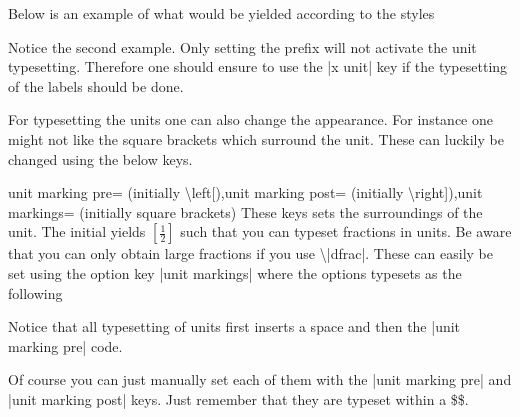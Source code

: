 Below is an example of what would be yielded according to the styles
\begin{codeexample}[code only]
\pgfplotsset{use units,x unit=T,xlabel=Temperature,ylabel=Nothing} 
\pgfplotsset{use units,x unit prefix=m,xlabel=Temperature,ylabel=Nothing} 
\end{codeexample}
Notice the second example. Only setting the prefix will not activate the unit typesetting. Therefore one should ensure to use the |x unit| key if the
typesetting of the labels should be done.

For typesetting the units one can also change the appearance. For instance one might not like the square brackets which surround the unit. These can
luckily be changed using the below keys.
\begin{pgfplotskeylist}{unit marking pre= (initially \textbackslash left[),unit marking post= (initially \textbackslash right]),unit markings= (initially square brackets)}
  These keys sets the surroundings of the unit. The initial yields $\left[\frac{1}{2}\right]$ such that you can typeset fractions in units. Be aware that
  you can only obtain large fractions if you use \textbackslash|dfrac|. These can easily be set using the option key |unit markings| where the options typesets as the following
\begin{codeexample}
\pgfplotsset{x unit=T,unit markings=parenthesis} %
\pgfplotsset{x unit=T,unit markings=square brackets} %
\pgfplotsset{x unit=T,unit markings=slash space} %
\end{codeexample}
  Notice that all typesetting of units first inserts a space and then the |unit marking pre| code.

  Of course you can just manually set each of them with the |unit marking pre| and |unit marking post| keys. Just remember that they are typeset within a \$\$.
\end{pgfplotskeylist}

